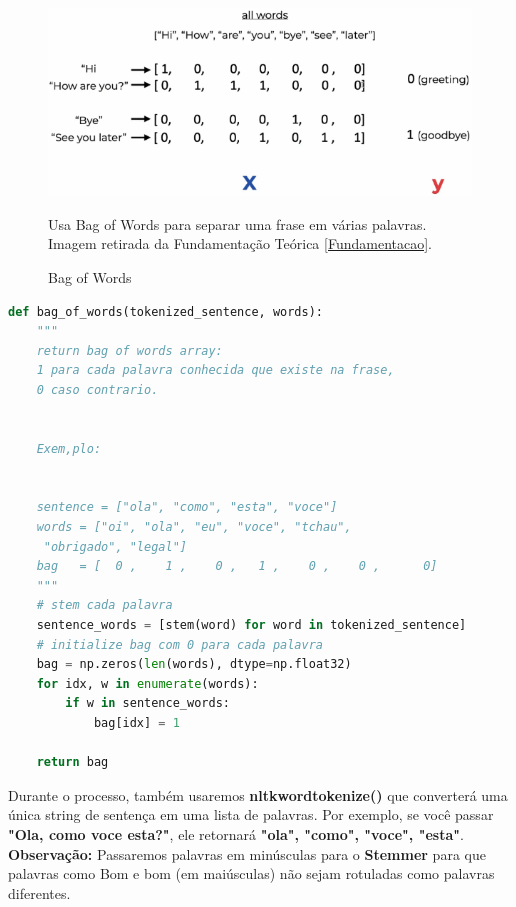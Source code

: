 \begin{figure}[H]
   \begin{center}
      \includegraphics[width=15cm]{img/bagofwords.png}
      \caption{Bag of Words} \label{BagofWords}
      \medskip
      \small
      Usa Bag of Words para separar uma frase em várias palavras. Imagem retirada da Fundamentação Teórica \ref{Fundamentacao}.
   \end{center}
\end{figure}


\begin{lstlisting}[language=Python, caption=Python Bag of Words]
def bag_of_words(tokenized_sentence, words):
    """
    return bag of words array:
    1 para cada palavra conhecida que existe na frase,
    0 caso contrario.


    Exem,plo:


    sentence = ["ola", "como", "esta", "voce"]
    words = ["oi", "ola", "eu", "voce", "tchau",
     "obrigado", "legal"]
    bag   = [  0 ,    1 ,    0 ,   1 ,    0 ,    0 ,      0]
    """
    # stem cada palavra
    sentence_words = [stem(word) for word in tokenized_sentence]
    # initialize bag com 0 para cada palavra
    bag = np.zeros(len(words), dtype=np.float32)
    for idx, w in enumerate(words):
        if w in sentence_words:
            bag[idx] = 1

    return bag

\end{lstlisting}

Durante o processo, também usaremos \textbf{nltkwordtokenize()} que converterá uma única string de sentença em uma lista de palavras. Por exemplo, se você passar \textbf{"Ola, como voce esta?"}, ele retornará \textbf{"ola", "como", "voce", "esta"}.
\textbf{Observação:} Passaremos palavras em minúsculas para o \textbf{Stemmer} para que palavras como Bom e bom (em maiúsculas) não sejam rotuladas como palavras diferentes.

